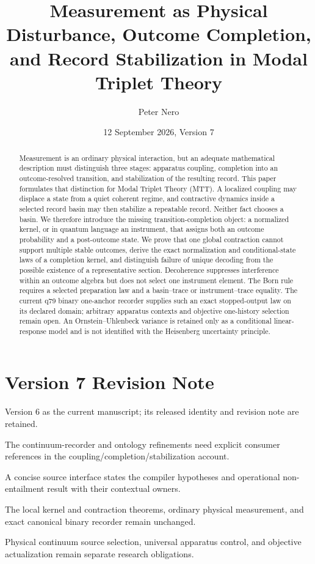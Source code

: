 \documentclass[11pt,a4paper]{article}
\title{Measurement as Physical Disturbance, Outcome Completion,\\
and Record Stabilization in Modal Triplet Theory}
\author{Peter Nero}
\date{12 September 2026, Version 7}
\theoremstyle{definition}
\theoremstyle{remark}
\begin{document}
\maketitle

\begin{abstract}
Measurement is an ordinary physical interaction, but an adequate mathematical
description must distinguish three stages: apparatus coupling, completion into
an outcome-resolved transition, and stabilization of the resulting record.
This paper formulates that distinction for Modal Triplet Theory (MTT). A
localized coupling may displace a state from a quiet coherent regime, and
contractive dynamics inside a selected record basin may then stabilize a
repeatable record. Neither fact chooses a basin. We therefore introduce the
missing transition-completion object: a normalized kernel, or in quantum
language an instrument, that assigns both an outcome probability and a
post-outcome state. We prove that one global contraction cannot support
multiple stable outcomes, derive the exact normalization and conditional-state
laws of a completion kernel, and distinguish failure of unique decoding from
the possible existence of a representative section. Decoherence suppresses
interference within an outcome algebra but does not select one instrument
element. The Born rule requires a selected preparation law and a basin--trace
or instrument--trace equality. The current q79 binary one-anchor recorder
supplies such an exact stopped-output law on its declared domain; arbitrary
apparatus contexts and objective one-history selection remain open. An
Ornstein--Uhlenbeck variance is retained only as a conditional linear-response
model and is not identified with the Heisenberg uncertainty principle.
\end{abstract}

\section*{Version 7 Revision Note}
\begin{description}[style=nextline]
\item[Supersedes] Version 6 as the current manuscript; its released identity
and revision note are retained.
\item[Reason] The continuum-recorder and ontology refinements need explicit
consumer references in the coupling/completion/stabilization account.
\item[Resolution] A concise source interface states the compiler hypotheses
and operational non-entailment result with their contextual owners.
\item[Retained] The local kernel and contraction theorems, ordinary physical
measurement, and exact canonical binary recorder remain unchanged.
\item[Open boundary] Physical continuum source selection, universal apparatus
control, and objective actualization remain separate research obligations.
\end{description}
\end{document}

